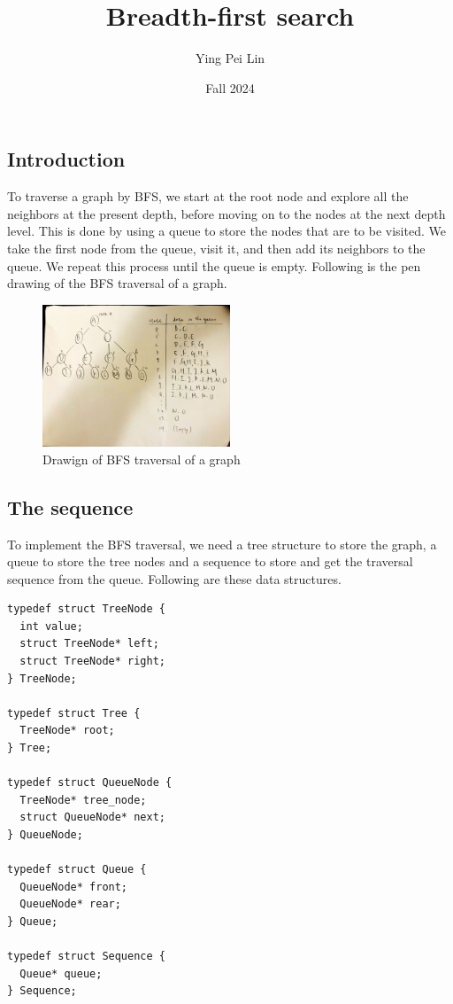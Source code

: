 \documentclass[a4paper,11pt]{article}
\begin{document}
\title{
  \textbf{Breadth-first search}
}
\author{Ying Pei Lin}
\date{Fall 2024}

\maketitle

\subsection*{Introduction}

To traverse a graph by BFS, we start at the root node and explore all the neighbors at the present depth,
before moving on to the nodes at the next depth level. This is done by using a queue to store the nodes
that are to be visited. We take the first node from the queue, visit it, and then add its neighbors to the
queue. We repeat this process until the queue is empty. Following is the pen drawing of the BFS traversal
of a graph.

\begin{figure}[H]
  \centering
  \includegraphics[width=0.5\textwidth]{./draw.pdf}
  \caption{Drawign of BFS traversal of a graph}
\end{figure}

\subsection*{The sequence}

To implement the BFS traversal, we need a tree structure to store the graph, a queue to store the tree
nodes and a sequence to store and get the traversal sequence from the queue. Following are these data
structures.

\begin{verbatim}
typedef struct TreeNode {
  int value;
  struct TreeNode* left;
  struct TreeNode* right;
} TreeNode;

typedef struct Tree {
  TreeNode* root;
} Tree;

typedef struct QueueNode {
  TreeNode* tree_node;
  struct QueueNode* next;
} QueueNode;

typedef struct Queue {
  QueueNode* front;
  QueueNode* rear;
} Queue;

typedef struct Sequence {
  Queue* queue;
} Sequence;
\end{verbatim}
\end{document}
